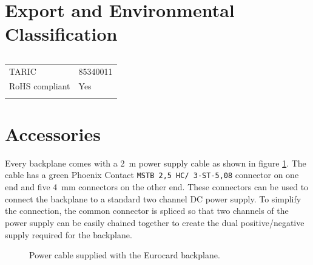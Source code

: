 \documentclass[10pt]{datasheet}
\begin{document}
\section{Export and Environmental Classification}
\begin{table}[h]
    \caption{}
    \begin{tabularx}{\textwidth}{l | X}
        \thickhline
        TARIC & 85340011 \\
        RoHS compliant & Yes \\
        \thickhline
    \end{tabularx}
\end{table}

\newpage
\section{Accessories}
Every backplane comes with a \qty{2}{\m} power supply cable as shown in figure \ref{fig:power_cable}. The cable has a green Phoenix Contact \texttt{\small{MSTB 2,5 HC/ 3-ST-5,08}} connector on one end and five \qty{4}{\mm} connectors on the other end. These connectors can be used to connect the backplane to a standard two channel DC power supply. To simplify the connection, the common connector is spliced so that two channels of the power supply can be easily chained together to create the dual positive/negative supply required for the backplane.

\begin{figure}[ht]
    \caption{Power cable supplied with the Eurocard backplane.}
    \label{fig:power_cable}
    \centering
    
\end{figure}
\end{document}
